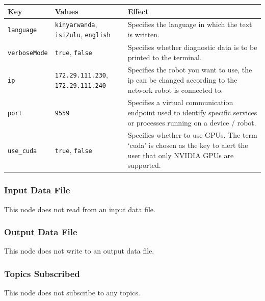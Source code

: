 \documentclass{CSSRforAfrica}
\begin{document}
{{\begin{center}
\begin{tabularx}{\linewidth}{| l | l | X|}
\hline 
{\small Key }                               & {\small Values }                                                 &  {\small Effect}       \\
\hline
{\footnotesize \verb+language+}  & {\footnotesize \verb+kinyarwanda+, \verb+isiZulu+, \verb+english+}  &  {\small Specifies the language in which the text is written.} \\ 
\hline
{\footnotesize \verb+verboseMode+}  & {\footnotesize \verb+true+, \verb+false+}     & {\small Specifies whether diagnostic data is to be printed to the terminal.} \\
\hline

{\footnotesize \verb+ip+}  & {\footnotesize \verb+172.29.111.230+, \verb+172.29.111.240+}     & {\small Specifies the robot you want to use, the ip can be changed according to the network robot is connected to.} \\
\hline

{\footnotesize \verb+port+}  & {\footnotesize \verb+9559+}     & {\small Specifies a virtual communication endpoint used to identify specific services or processes running on a device / robot.} \\
\hline

{\footnotesize \verb+use_cuda+}  & {\footnotesize \verb+true+, \verb+false+}     & {\small Specifies whether to use GPUs. The term `cuda' is chosen as the key to alert the user that only NVIDIA GPUs are supported.} \\
\hline

\end{tabularx}
\end{center}


\subsubsection*{Input Data File}
This node does not read from an input data file.


\subsubsection*{Output Data File}
This node does not write to an output data file.


\subsubsection*{Topics Subscribed}
This node does not subscribe to any topics.
 

}}
\end{document}

